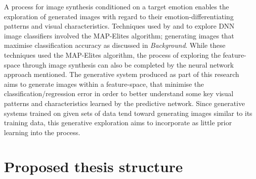\documentclass{article}
\begin{document}
A process for image synthesis conditioned on a target emotion enables the exploration of generated images with regard to their emotion-differentiating patterns and visual characteristics.
Techniques used by \citet{nguyen2015deep} and \citet{nguyen2015innovation} to explore DNN image classifiers involved the MAP-Elites algorithm; generating images that maximise classification accuracy as discussed in \textit{Background}.
While these techniques used the MAP-Elites algorithm, the process of exploring the feature-space through image synthesis can also be completed by the neural network approach mentioned.
The generative system produced as part of this research aims to generate images within a feature-space, that minimise the classification/regression error in order to better understand some key visual patterns and characteristics learned by the predictive network.
Since generative systems trained on given sets of data tend toward generating images similar to its training data, this generative exploration aims to incorporate as little prior learning into the process.

\section{Proposed thesis structure}
\end{document}
